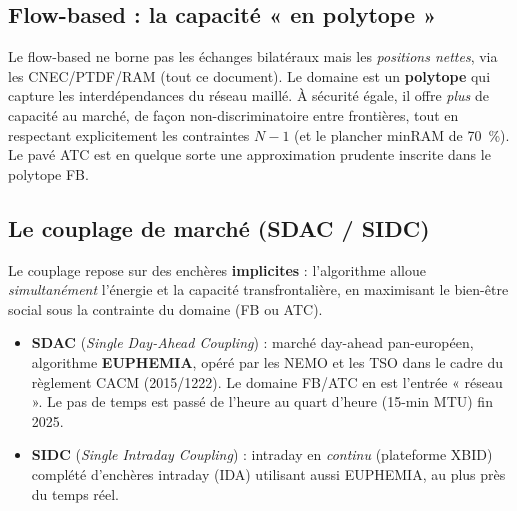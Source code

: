 \documentclass[11pt,a4paper]{article}
\begin{document}
\subsection{Flow-based : la capacité « en polytope »}

Le flow-based ne borne pas les échanges bilatéraux mais les \emph{positions
nettes}, via les CNEC/PTDF/RAM (tout ce document). Le domaine est un
\textbf{polytope} qui capture les interdépendances du réseau maillé. À
sécurité égale, il offre \emph{plus} de capacité au marché, de façon
non-discriminatoire entre frontières, tout en respectant explicitement les
contraintes $N\!-\!1$ (et le plancher minRAM de 70~\%). Le pavé ATC est en
quelque sorte une approximation prudente inscrite dans le polytope FB.

\begin{center}
\end{center}

\subsection{Le couplage de marché (SDAC / SIDC)}

Le couplage repose sur des enchères \textbf{implicites} : l'algorithme alloue
\emph{simultanément} l'énergie et la capacité transfrontalière, en maximisant
le bien-être social sous la contrainte du domaine (FB ou ATC).
\begin{itemize}[nosep,leftmargin=1.4em]
  \item \textbf{SDAC} (\emph{Single Day-Ahead Coupling}) : marché day-ahead
        pan-européen, algorithme \textbf{EUPHEMIA}, opéré par les NEMO et les
        TSO dans le cadre du règlement CACM (2015/1222). Le domaine FB/ATC en
        est l'entrée « réseau ». Le pas de temps est passé de l'heure au
        quart d'heure (15-min MTU) fin 2025.
  \item \textbf{SIDC} (\emph{Single Intraday Coupling}) : intraday en
        \emph{continu} (plateforme XBID) complété d'enchères intraday (IDA)
        utilisant aussi EUPHEMIA, au plus près du temps réel.
\end{itemize}
\end{document}
